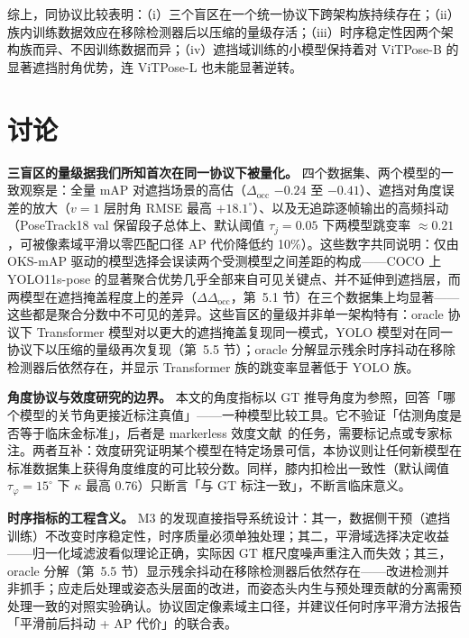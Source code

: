 \documentclass[10pt,conference]{IEEEtran}
\begin{document}
综上，同协议比较表明：（i）三个盲区在一个统一协议下跨架构族持续存在；（ii）族内训练数据效应在移除检测器后以压缩的量级存活；（iii）时序稳定性因两个架构族而异、不因训练数据而异；（iv）遮挡域训练的小模型保持着对 ViTPose-B 的显著遮挡肘角优势，连 ViTPose-L 也未能显著逆转。

\section{讨论}

\textbf{三盲区的量级据我们所知首次在同一协议下被量化。} 四个数据集、两个模型的一致观察是：全量 mAP 对遮挡场景的高估（$\Delta_{\mathrm{occ}}$ $-0.24$ 至 $-0.41$）、遮挡对角度误差的放大（$v{=}1$ 层肘角 RMSE 最高 $+18.1^{\circ}$）、以及无追踪逐帧输出的高频抖动（PoseTrack18 val 保留段子总体上、默认阈值 $\tau_j=0.05$ 下两模型跳变率 $\approx0.21$，可被像素域平滑以零匹配口径 AP 代价降低约 10\%）。这些数字共同说明：仅由 OKS-mAP 驱动的模型选择会误读两个受测模型之间差距的构成——COCO 上 YOLO11s-pose 的显著聚合优势几乎全部来自可见关键点、并不延伸到遮挡层，而两模型在遮挡掩盖程度上的差异（$\Delta\Delta_{\mathrm{occ}}$，第~5.1 节）在三个数据集上均显著——这些都是聚合分数中不可见的差异。这些盲区的量级并非单一架构特有：oracle 协议下 Transformer 模型对以更大的遮挡掩盖复现同一模式，YOLO 模型对在同一协议下以压缩的量级再次复现（第~5.5 节）；oracle 分解显示残余时序抖动在移除检测器后依然存在，并显示 Transformer 族的跳变率显著低于 YOLO 族。

\textbf{角度协议与效度研究的边界。} 本文的角度指标以 GT 推导角度为参照，回答「哪个模型的关节角更接近标注真值」——一种模型比较工具。它不验证「估测角度是否等于临床金标准」，后者是 markerless 效度文献~\cite{4,5,6}的任务，需要标记点或专家标注。两者互补：效度研究证明某个模型在特定场景可信，本协议则让任何新模型在标准数据集上获得角度维度的可比较分数。同样，膝内扣检出一致性（默认阈值 $\tau_\varphi{=}15^{\circ}$ 下 $\kappa$ 最高 0.76）只断言「与 GT 标注一致」，不断言临床意义。

\textbf{时序指标的工程含义。} M3 的发现直接指导系统设计：其一，数据侧干预（遮挡训练）不改变时序稳定性，时序质量必须单独处理；其二，平滑域选择决定收益——归一化域滤波看似理论正确，实际因 GT 框尺度噪声重注入而失效；其三，oracle 分解（第~5.5 节）显示残余抖动在移除检测器后依然存在——改进检测并非抓手；应走后处理或姿态头层面的改进，而姿态头内生与预处理贡献的分离需预处理一致的对照实验确认。协议固定像素域主口径，并建议任何时序平滑方法报告「平滑前后抖动 + AP 代价」的联合表。
\end{document}
